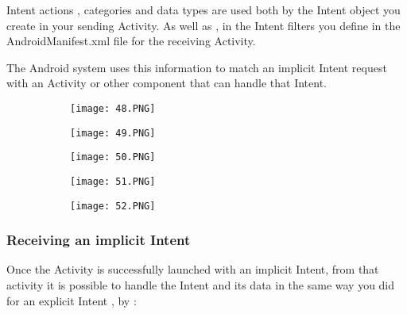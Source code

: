 \documentclass{article}
\begin{document}
Intent actions , categories and data types are used both by the Intent object you create in your sending Activity. As well as , in the Intent filters you define in the AndroidManifest.xml file for the receiving Activity.

The Android system uses this information to match an implicit Intent request with an Activity or other component that can handle that Intent.

  \begin{figure}[ht!]
  \centering
  \begin{subfigure}[b]{0.6\linewidth}
    \texttt{[image: 48.PNG]}
  \end{subfigure}
  \end{figure}

  \begin{figure}[ht!]
  \centering
  \begin{subfigure}[b]{0.6\linewidth}
    \texttt{[image: 49.PNG]}
  \end{subfigure}
  \end{figure}

   \begin{figure}[ht!]
  \centering
  \begin{subfigure}[b]{0.6\linewidth}
    \texttt{[image: 50.PNG]}
  \end{subfigure}
  \end{figure}

     \begin{figure}[ht!]
  \centering
  \begin{subfigure}[b]{0.6\linewidth}
    \texttt{[image: 51.PNG]}
  \end{subfigure}
  \end{figure}

   \begin{figure}[ht!]
  \centering
  \begin{subfigure}[b]{0.6\linewidth}
    \texttt{[image: 52.PNG]}
  \end{subfigure}
  \end{figure}

\vspace{50mm}

  \subsubsection{Receiving an implicit Intent}

  Once the Activity is successfully launched with an implicit Intent, from that activity it is possible to handle the Intent and its data in the same way you did for an explicit Intent , by :
\end{document}
